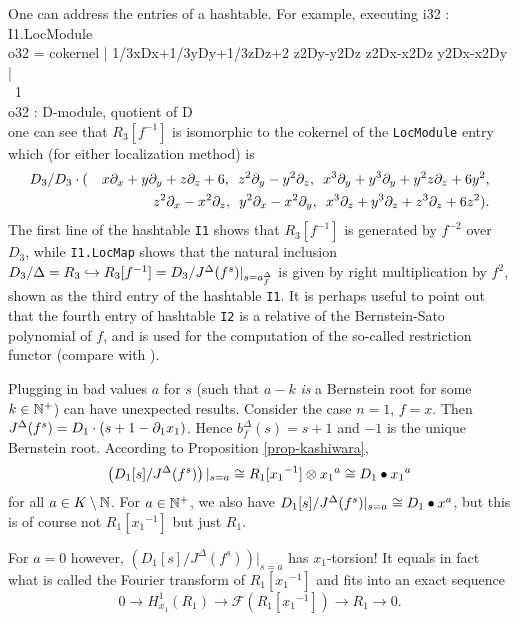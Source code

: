 \begin{example}
One can address the entries of a hashtable.  For
example, executing
\beginOutput
i32 : I1.LocModule\\
\emptyLine
o32 = cokernel | 1/3xDx+1/3yDy+1/3zDz+2 z2Dy-y2Dz z2Dx-x2Dz y2Dx-x2Dy |\\
\emptyLine
\                             1\\
o32 : D-module, quotient of D\\
\endOutput
one can see that 
$R_3[f^{-1}]$ is isomorphic to the cokernel of the {\tt LocModule}
entry which (for either localization method) is
\begin{eqnarray*}
D_3/&D_3\cdot(&x\partial_x+y\partial_y+z\partial_z+6,\,\,\,z^2\partial_y-y^2\partial_z,\,\,\,x^3\partial_y+y^3\partial_y+y^2z\partial_z+6y^2,\\ 
         &&      z^2\partial_x-x^2\partial_z,\,\,\,y^2\partial_x-x^2\partial_y,\,\,\, 
               x^3\partial_z+y^3\partial_z+z^3\partial_z+6z^2).
\end{eqnarray*}
The first line of the hashtable {\tt I1} shows 
that $R_3[f^{-1}]$ is generated
by $f^{-2}$ over $D_3$, while {\tt I1.LocMap} shows that the natural inclusion
$D_3/\Delta=R_3\hookrightarrow R_3[f^{-1}]=D_3/J^\Delta(f^s)|_{s=a^\Delta_f}$ 
is given by right multiplication by $f^2$, shown as the third entry
of the hashtable {\tt I1}.
It is perhaps useful to point out that the fourth entry of hashtable
{\tt I2} is a relative of the Bernstein-Sato polynomial of $f$, and is
used for the computation of the so-called restriction functor (compare
with \cite{DM:O-T1,DM:W2}).
\end{example}

\begin{remark}
Plugging in bad values $a$ for $s$ (such that $a-k$ {\em is} a Bernstein
root for some $k\in {\mathbb N}^+$) can have unexpected results. Consider the
case $n=1$, $f=x$. Then $J^\Delta(f^s)=D_1\cdot(s+1-\partial_1x_1)$. Hence
$b^\Delta_f(s)=s+1$ and $-1$ is the unique Bernstein root. According
to Proposition \ref{prop-kashiwara}, 
\[
\left(D_1[s]/J^\Delta(f^s)\right)|_{s=a}
\cong R_1[{x_1}^{-1}]\otimes {x_1}^a\cong D_1\bullet {x_1}^a
\]
for all $a\in K\setminus{\mathbb N}$. For $a\in{\mathbb N}^+$, we also have
$D_1[s]/J^\Delta(f^s)|_{s=a}\cong D_1\bullet x^a$, but this is of
course not $R_1[{x_1}^{-1}]$ but just $R_1$. 

For $a=0$ however, $\left(D_1[s]/J^\Delta(f^s)\right)|_{s=a}$ 
has $x_1$-torsion! It
equals in fact what is called the Fourier transform of
$R_1[{x_1}^{-1}]$ and fits into an exact sequence 
\[
0\to H^1_{x_1}(R_1)\to{\mathcal F}(R_1[{x_1}^{-1}])\to R_1\to 0.
\]
\end{remark}



